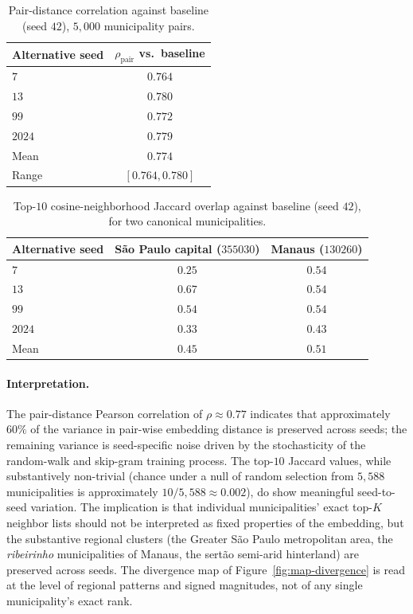 \begin{table}[h!]
\centering
\caption{Pair-distance correlation against baseline (seed $42$),
$5{,}000$ municipality pairs.}
\label{tab:stab-pairs}
\small
\begin{tabular}{lc}
\toprule
Alternative seed & $\rho_{\text{pair}}$ vs.\ baseline \\
\midrule
$7$    & $0.764$ \\
$13$   & $0.780$ \\
$99$   & $0.772$ \\
$2024$ & $0.779$ \\
\midrule
Mean   & $0.774$ \\
Range  & $[0.764, 0.780]$ \\
\bottomrule
\end{tabular}
\end{table}

\begin{table}[h!]
\centering
\caption{Top-$10$ cosine-neighborhood Jaccard overlap against baseline
(seed $42$), for two canonical municipalities.}
\label{tab:stab-jaccard}
\small
\begin{tabular}{lcc}
\toprule
Alternative seed & São Paulo capital ($355030$) & Manaus ($130260$) \\
\midrule
$7$    & $0.25$ & $0.54$ \\
$13$   & $0.67$ & $0.54$ \\
$99$   & $0.54$ & $0.54$ \\
$2024$ & $0.33$ & $0.43$ \\
\midrule
Mean   & $0.45$ & $0.51$ \\
\bottomrule
\end{tabular}
\end{table}

\paragraph{Interpretation.} The pair-distance Pearson correlation of
$\rho \approx 0.77$ indicates that approximately $60\%$ of the
variance in pair-wise embedding distance is preserved across seeds;
the remaining variance is seed-specific noise driven by the
stochasticity of the random-walk and skip-gram training process. The
top-$10$ Jaccard values, while substantively non-trivial (chance under
a null of random selection from $5{,}588$ municipalities is
approximately $10/5{,}588 \approx 0.002$), do show meaningful
seed-to-seed variation. The implication is that individual
municipalities' exact top-$K$ neighbor lists should not be interpreted
as fixed properties of the embedding, but the substantive regional
clusters (the Greater São Paulo metropolitan area, the
\emph{ribeirinho} municipalities of Manaus, the sertão semi-arid
hinterland) are preserved across seeds. The divergence map of
Figure~\ref{fig:map-divergence} is read at the level of regional
patterns and signed magnitudes, not of any single municipality's exact
rank.

